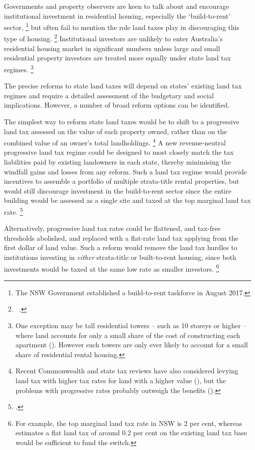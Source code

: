 Governments and property observers are keen to talk about and encourage institutional investment in residential housing, especially the `build-to-rent' sector,%
    \footnote{The NSW Government established a build-to-rent taskforce in August 2017.} 
but often fail to mention the role land taxes play in discouraging this type of housing.%
    \footnote{\eg~\textcite{EY-2017-multi-family-asset-class-australia}.}
Institutional investors are unlikely to enter Australia's residential housing market in significant numbers unless large and small residential property investors are treated more equally under state land tax regimes.%
    \footnote{One exception may be tall residential towers -- such as 10 storeys or higher -- where land accounts for only a small share of the cost of constructing each apartment 
    (\textcite{Ahlfeldt-McMillen-Vox-2017-Skyscrapers-and-land-values}). 
    However such towers are only ever likely to account for a small share of residential rental housing.} 

The precise reforms to state land taxes will depend on states' existing land tax regimes and require a detailed assessment of the budgetary and social implications. However, a number of broad reform options can be identified.

The simplest way to reform state land taxes would be to shift to a progressive land tax assessed on the value of each property owned, rather than on the combined value of an owner's total landholdings.%
	\footnote{Recent Commonwealth and state tax reviews have also considered levying land tax with higher tax rates for land with a higher value 
	(\textcites[][265]{HenryTaxReview2010}[][41]{GovernmentSouthAustralia2015-State-Tax-Review-Discussion-Paper}), but the problems with progressive rates probably outweigh the benefits (\textcite[][18]{DaleyCoates-2015-Property-taxes}).} 
A new revenue-neutral progressive land tax regime could be designed to most closely match the tax liabilities paid by existing landowners in each state, thereby minimising the windfall gains and losses from any reform. Such a land tax regime would provide incentives to assemble a portfolio of multiple strata-title rental properties, but would still discourage investment in the build-to-rent sector since the entire building would be assessed as a single site and taxed at the top marginal land tax rate.%
	\footcite[][16]{Freebairn-2017-Reform-options-for-state-property-taxes} 

Alternatively, progressive land tax rates could be flattened, and tax-free thresholds abolished, and replaced with a flat-rate land tax applying from the first dollar of land value. Such a reform would remove the land tax hurdles to institutions investing in \textit{either} strata-title or built-to-rent housing, since both investments would be taxed at the same low rate as smaller investors.%
	\footnote{For example, the top marginal land tax rate in NSW is 2 per cent, whereas \textcite[][12]{Freebairn-2017-Reform-options-for-state-property-taxes} estimates a flat land tax of around 0.2 per cent on the existing land tax base would be sufficient to fund the switch.} 

